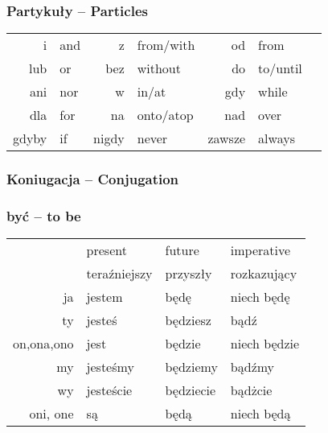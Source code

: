 \documentclass[12pt]{refcard}
\begin{document}
\subsubsection{Partykuły -- Particles}
\vspace{-1ex}
\begin{tabular}{@{}r@{\,--\,}l@{ }r@{\,--\,}l@{ }r@{\,--\,}ll}
i         & and         &
z         & from/with   &
od        & from        &
\\

lub       & or          &
bez       & without     &
do        & to/until    &
\\

ani       & nor         &
w         & in/at       &
gdy       & while       &
\\

dla       & for         &
na        & onto/atop   &
nad       & over        &
\\

gdyby     & if          &
nigdy     & never       &
zawsze    & always      &
\\
\end{tabular}



\subsubsection{Koniugacja -- Conjugation}

\subsubsection{być -- to be}
\vspace{-1ex}
\begin{tabular}{rlll}
\scriptsize            & \footnotesize present
\scriptsize            & \footnotesize future
\scriptsize            & \footnotesize imperative \\[-1ex]
\scriptsize            & \footnotesize teraźniejszy
\scriptsize            & \footnotesize przyszły
\scriptsize            & \footnotesize rozkazujący \\
\scriptsize ja         & jestem    & będę      & niech będę   \\
\scriptsize ty         & jesteś    & będziesz  & bądź         \\
\scriptsize on,ona,ono & jest      & będzie    & niech będzie \\
\scriptsize my         & jesteśmy  & będziemy  & bądźmy       \\
\scriptsize wy         & jesteście & będziecie & bądżcie      \\
\scriptsize oni, one   & są        & będą      & niech będą   \\[1ex]
\end{tabular}
\end{document}
